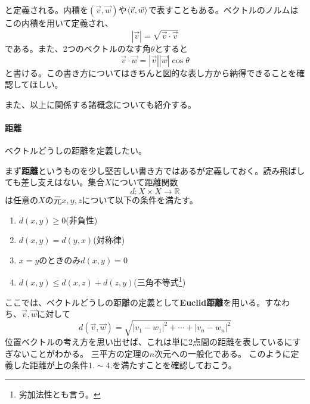 \documentclass[10pt]{jsarticle}
\theoremstyle{definition}%
\newcommand{\vc}[1]{\overrightarrow{#1}}%
\numberwithin{equation}{section}%
\begin{document}
\begin{framed}
\begin{description}
\begin{equation}
  \end{equation}
と定義される。内積を$(\vec{v},\vec{w})$や$\braket{\vec{v},\vec{w}}$で表すこともある。ベクトルのノルムはこの内積を用いて定義され、
\begin{equation}
  |\vec{v}|=\sqrt{\vec{v}\cdot \vec{v}}
\end{equation}
である。また、2つのベクトルのなす角$\theta$とすると
\begin{equation}
  \vec{v}\cdot \vec{w}=|\vec{v}||\vec{w}|\cos{\theta}
\end{equation}
と書ける。この書き方についてはきちんと図的な表し方から納得できることを確認してほしい。
\end{description}
\end{framed}
また、以上に関係する諸概念についても紹介する。
\paragraph{距離}ベクトルどうしの距離を定義したい。


まず{\bf 距離}というものを少し堅苦しい書き方ではあるが定義しておく。読み飛ばしても差し支えはない。集合$X$について距離関数
\begin{equation}
  d:X\times X \to \mathbb{R}
\end{equation}
は任意の$X$の元$x,y,z$について以下の条件を満たす。
\begin{enumerate}
  \item $d(x,y)\geq 0$(非負性)
  \item $d(x,y)=d(y,x)$(対称律)
  \item $x=y$のときのみ$d(x,y)=0$
  \item $d(x,y)\leq d(x,z)+d(z,y)$(三角不等式\footnote{劣加法性とも言う。})
\end{enumerate}
ここでは、ベクトルどうしの距離の定義として{\bf Euclid距離}を用いる。すなわち、$\vc{v},\vc{w}$に対して
\begin{equation}
  \label{kyori}d(\vc{v},\vc{w})=\sqrt{|v_{1}-w_{1}|^{2}+\cdots +|v_{n}-w_{n}|^{2}}
\end{equation}
位置ベクトルの考え方を思い出せば、これは単に2点間の距離を表しているにすぎないことがわかる。
三平方の定理の$n$次元への一般化である。
このように定義した距離が上の条件$1.\sim 4.$を満たすことを確認しておこう。
\end{document}
